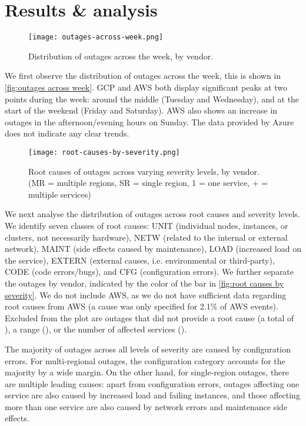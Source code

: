 \section{Results \& analysis}
\begin{figure}[h]
  \centering
  \texttt{[image: outages-across-week.png]}
  \caption{Distribution of outages across the week, by vendor.}
  \label{fig:outages across week}
\end{figure}

We first observe the distribution of outages across the week, this is shown in \autoref{fig:outages across week}.
GCP and AWS both display significant peaks at two points during the week: around the middle (Tuesday and Wednesday), and at the start of the weekend (Friday and Saturday).
AWS also shows an increase in outages in the afternoon/evening hours on Sunday.
The data provided by Azure does not indicate any clear trends.

\begin{figure}[h]
  \centering
  \texttt{[image: root-causes-by-severity.png]}
  \caption{Root causes of outages across varying severity levels, by vendor. (MR = multiple regions, SR = single region, 1 = one service, + = multiple services)}
  \label{fig:root causes by severity}
\end{figure}

We next analyse the distribution of outages across root causes and severity levels.
We identify seven classes of root causes: UNIT (individual nodes, instances, or clusters, not necessarily hardware), NETW (related to the internal or external network), MAINT (side effects caused by maintenance), LOAD (increased load on the service), EXTERN (external causes, i.e. environmental or third-party), CODE (code errors/bugs), and CFG (configuration errors).
We further separate the outages by vendor, indicated by the color of the bar in \autoref{fig:root causes by severity}.
We do not include AWS, as we do not have sufficient data regarding root causes from AWS (a cause was only specified for 2.1\% of AWS events).
Excluded from the plot are outages that did not provide a root cause (a total of ), a range (), or the number of affected services ().

The majority of outages across all levels of severity are caused by configuration errors.
For multi-regional outages, the configuration category accounts for the majority by a wide margin.
On the other hand, for single-region outages, there are multiple leading causes: apart from configuration errors, outages affecting one service are also caused by increased load and failing instances, and those affecting more than one service are also caused by network errors and maintenance side effects.

